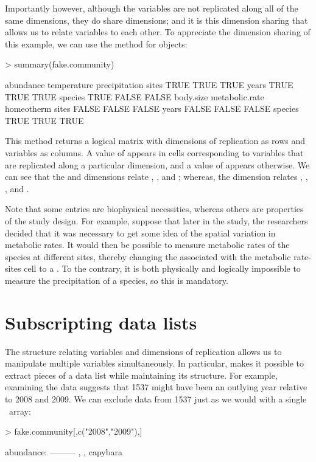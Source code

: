 \documentclass[a4paper]{report}
\numberwithin{exercise}{section}
\begin{document}
\begin{article}
Importantly however, although the variables are not replicated along all of the same dimensions, they do share dimensions; and it is this dimension sharing that allows us to relate variables to each other.  To appreciate the dimension sharing of this example, we can use the  method for  objects: %
\begin{Schunk}
\begin{Sinput}
> summary(fake.community)
\end{Sinput}
\begin{Soutput}
        abundance temperature precipitation
sites        TRUE        TRUE          TRUE
years        TRUE        TRUE          TRUE
species      TRUE       FALSE         FALSE
        body.size metabolic.rate homeotherm
sites       FALSE          FALSE      FALSE
years       FALSE          FALSE      FALSE
species      TRUE           TRUE       TRUE
\end{Soutput}
\end{Schunk}
This method returns a logical matrix with dimensions of replication as rows and variables as columns.  A value of  appears in cells corresponding to variables that are replicated along a particular dimension, and a value of  appears otherwise.  We can see that the  and  dimensions relate , , and ; whereas, the  dimension relates , , , and .

Note that some  entries are biophysical necessities, whereas others are properties of the study design.  For example, suppose that later in the study, the researchers decided that it was necessary to get some idea of the spatial variation in metabolic rates.  It would then be possible to measure metabolic rates of the species at different sites, thereby changing the  associated with the metabolic rate-sites cell to a .  To the contrary, it is both physically and logically impossible to measure the precipitation of a species, so this  is mandatory.

\section{Subscripting data lists}

The structure relating variables and dimensions of replication allows us to manipulate multiple variables simultaneously.  In particular,  makes it possible to extract pieces of a data list while maintaining its structure.  For example, examining the data suggests that 1537 might have been an outlying year relative to 2008 and 2009.  We can exclude data from 1537 just as we would with a single \R\ array:
\begin{Schunk}
\begin{Sinput}
> fake.community[,c("2008","2009"),]
\end{Sinput}
\begin{Soutput}
abundance:
---------
, , capybara


\end{Soutput}
\end{Schunk}
\end{article}
\end{document}
